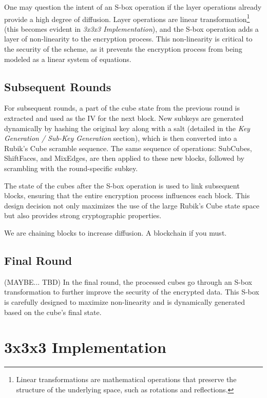 \documentclass[12pt]{article}
\begin{document}
One may question the intent of an S-box operation if the layer operations already provide a high degree of diffusion. Layer operations are linear transformation\footnote{Linear transformations are mathematical operations that preserve the structure of the underlying space, such as rotations and reflections.} (this becomes evident in \textit{3x3x3 Implementation}), and the S-box operation adds a layer of non-linearity to the encryption process. This non-linearity is critical to the security of the scheme, as it prevents the encryption process from being modeled as a linear system of equations. 

\vspace{0.5cm}

\subsection{Subsequent Rounds}
For subsequent rounds, a part of the cube state from the previous round is extracted and used as the IV for the next block. New subkeys are generated dynamically by hashing the original key along with a salt (detailed in the \textit{Key Generation / Sub-Key Generation} section), which is then converted into a Rubik's Cube scramble sequence. The same sequence of operations: SubCubes, ShiftFaces, and MixEdges, are then applied to these new blocks, followed by scrambling with the round-specific subkey.

The state of the cubes after the S-box operation is used to link subsequent blocks, ensuring that the entire encryption process influences each block. This design decision not only maximizes the use of the large Rubik's Cube state space but also provides strong cryptographic properties.

We are chaining blocks to increase diffusion. A blockchain if you must.
\subsection{Final Round}

(MAYBE... TBD) In the final round, the processed cubes go through an S-box transformation to further improve the security of the encrypted data. This S-box is carefully designed to maximize non-linearity and is dynamically generated based on the cube's final state.

\section{3x3x3 Implementation}
\end{document}
